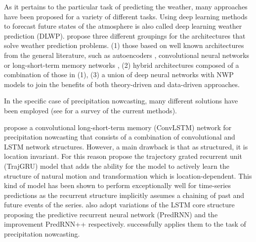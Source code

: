As it pertains to the particular task of predicting the weather, many approaches have been proposed for a variety of different tasks. Using deep learning methods to forecast future states of the atmosphere is also called deep learning weather prediction (DLWP). \citet{Ren2021DeepSurvey} propose three different groupings for the architectures that solve weather prediction problems. (1) those based on well known architectures from the general literature, such as autoencoders \citep{Lin2018DynamicForecast,Hossain2015ForecastingApproach}, convolutional neural networks \citep{Qiu2017ANetworks} or long-short-term memory networks \citep{Karevan2018Spatio-temporalForecasting}, (2) hybrid architectures composed of a combination of those in (1), (3) a union of deep neural networks with NWP models to join the benefits of both theory-driven and data-driven approaches.

In the specific case of precipitation nowcasting, many different solutions have been employed (see \citet{Ren2021DeepSurvey} for a survey of the current methods).


\citet{Shi2015ConvolutionalNowcasting} propose a convolutional long-short-term memory (ConvLSTM) network for precipitation nowcasting that consists of a combination of convolutional and LSTM network structures. However, a main drawback is that as structured, it is location invariant. For this reason \citet{Shi2017DeepModel} propose the trajectory grated recurrent unit (TrajGRU) model that adds the ability for the model to actively learn the structure of natural motion and transformation which is location-dependent. This kind of model has been shown to perform exceptionally well for time-series predictions as the recurrent structure implicitly assumes a chaining of past and future events of the series. \citet{Wang2017PredRNN:LSTMs,Wang2018PredRNN++:Learning} also adopt variations of the LSTM core structure proposing the predictive recurrent neural network (PredRNN) and the improvement PredRNN++ respectively. \citet{Wang2018ApplicationNowcasting} successfully applies them to the task of precipitation nowcasting.

